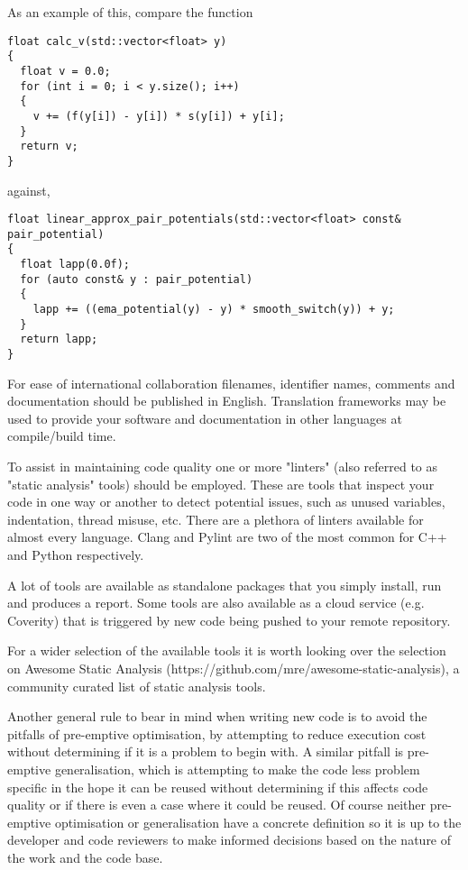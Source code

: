 \documentclass[jnr]{iosart2x}
\begin{document}
As an example of this, compare the function \cite{Lim_2015}

\begin{lstlisting}
float calc_v(std::vector<float> y)
{
  float v = 0.0;
  for (int i = 0; i < y.size(); i++)
  {
    v += (f(y[i]) - y[i]) * s(y[i]) + y[i];
  }
  return v;
}
\end{lstlisting}

against,

\begin{lstlisting}
float linear_approx_pair_potentials(std::vector<float> const& pair_potential)
{
  float lapp(0.0f);
  for (auto const& y : pair_potential)
  {
    lapp += ((ema_potential(y) - y) * smooth_switch(y)) + y;
  }
  return lapp;
}
\end{lstlisting}

For ease of international collaboration filenames, identifier names, comments and documentation should be published in English.
Translation frameworks may be used to provide your software and documentation in other languages at compile/build time.

To assist in maintaining code quality one or more "linters" (also referred to as "static analysis" tools) should be employed.
These are tools that inspect your code in one way or another to detect potential issues, such as unused variables, indentation, thread misuse, etc.
There are a plethora of linters available for almost every language.
Clang and Pylint are two of the most common for C++ and Python respectively.

A lot of tools are available as standalone packages that you simply install, run and produces a report.
Some tools are also available as a cloud service (e.g. Coverity) that is triggered by new code being pushed to your remote repository.

For a wider selection of the available tools it is worth looking over the selection on Awesome Static Analysis (https://github.com/mre/awesome-static-analysis), a community curated list of static analysis tools.

Another general rule to bear in mind when writing new code is to avoid the pitfalls of pre-emptive optimisation, by attempting to reduce execution cost without determining if it is a problem to begin with.
A similar pitfall is pre-emptive generalisation, which is attempting to make the code less problem specific in the hope it can be reused without determining if this affects code quality or if there is even a case where it could be reused.
Of course neither pre-emptive optimisation or generalisation have a concrete definition so it is up to the developer and code reviewers to make informed decisions based on the nature of the work and the code base.
\end{document}
